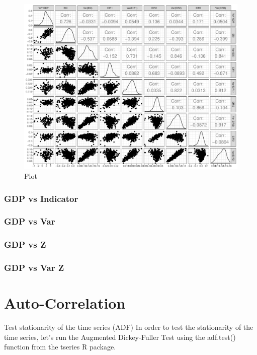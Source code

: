\documentclass[12pt,a4paper,oneside]{book}
\begin{document}
\begin{figure}[H]
    \centering
    \includegraphics[scale=0.5]{Graphs/corr_indicators.pdf}
    \caption{Plot }
    \label{fig:corr indicators}
\end{figure}

\subsubsection{GDP vs Indicator}

\subsubsection{GDP vs Var}

\subsubsection{GDP vs Z}

\subsubsection{GDP vs Var Z}




\section{Auto-Correlation}

Test stationarity of the time series (ADF)
In order to test the stationarity of the time series, let’s run the Augmented Dickey-Fuller Test using the adf.test() function from the tseries R package.
\end{document}
